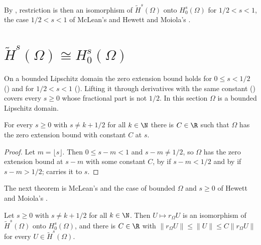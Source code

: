 By , restriction is then an isomorphism of
$\tilde H^s(\Omega)$ onto $H^s_0(\Omega)$ for $1/2 < s < 1$, the case $1/2 < s < 1$ of McLean's
\cite[Theorem 3.33]{McLean} and Hewett and Moiola's \cite[Lemma 2.1]{HewettMoiola}.

\section{\texorpdfstring{$\tilde H^s(\Omega) \cong H^s_0(\Omega)$}{H̃\^{}s ≅ H\^{}s\_0}}
\label{sec:tilde-zero-boundary}

On a bounded Lipschitz domain the zero extension bound holds for $0 \leq s < 1/2$
() and for $1/2 < s < 1$ ().
Lifting it through derivatives with the same constant ()
covers every $s \geq 0$ whose fractional part is not $1/2$. In this section $\Omega$ is a bounded
Lipschitz domain.

\begin{theorem}
\label{thm:zero-extension-bound-all}
\leanok
{}
For every $s \geq 0$ with $s \neq k + 1/2$ for all $k \in \N$ there is $C \in \R$ such that
$\Omega$ has the zero extension bound with constant $C$ at $s$.
\end{theorem}

\begin{proof}
\leanok
Let $m = \lfloor s \rfloor$. Then $0 \leq s - m < 1$ and $s - m \neq 1/2$, so $\Omega$ has the
zero extension bound at $s - m$ with some constant $C$, by  if
$s - m < 1/2$ and by  if $s - m > 1/2$;
 carries it to $s$.
\end{proof}

The next theorem is McLean's \cite[Theorem 3.33]{McLean} and the case of bounded $\Omega$ and
$s \geq 0$ of Hewett and Moiola's \cite[Lemma 2.1]{HewettMoiola}.

\begin{theorem}
\label{thm:tilde-zero-boundary}
\leanok
{}
Let $s \geq 0$ with $s \neq k + 1/2$ for all $k \in \N$. Then $U \mapsto r_\Omega U$ is an
isomorphism of $\tilde H^s(\Omega)$ onto $H^s_0(\Omega)$, and there is $C \in \R$ with
$\|r_\Omega U\| \leq \|U\| \leq C \|r_\Omega U\|$ for every $U \in \tilde H^s(\Omega)$.
\end{theorem}

